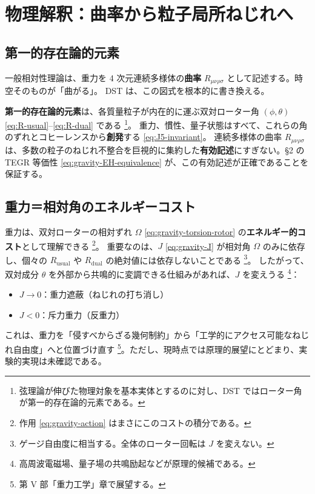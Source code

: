\documentclass[dvipdfmx,a4paper,oneside]{jsbook}
\numberwithin{equation}{chapter}
\begin{document}
\section{物理解釈：曲率から粒子局所ねじれへ}

\subsection{第一的存在論的元素}

一般相対性理論は、重力を 4 次元連続多様体の\textbf{曲率} \(R_{\mu\nu\rho\sigma}\) として記述する。時空そのものが「曲がる」。
DST は、この図式を根本的に書き換える。

\textbf{第一的存在論的元素}は、各質量粒子が内在的に運ぶ双対ローター角 \((\phi, \theta)\) \eqref{eq:R-usual}–\eqref{eq:R-dual} である \footnote{弦理論が伸びた物理対象を基本実体とするのに対し、DST ではローター角が第一的存在論的元素である。}。
重力、慣性、量子状態はすべて、これらの角のずれとコヒーレンスから\textbf{創発}する \eqref{eq:J5-invariant}。
連続多様体の曲率 \(R_{\mu\nu\rho\sigma}\) は、多数の粒子のねじれ不整合を巨視的に集約した\textbf{有効記述}にすぎない。§2 の TEGR 等価性 \eqref{eq:gravity-EH-equivalence} が、この有効記述が正確であることを保証する。

\subsection{重力＝相対角のエネルギーコスト}

重力は、双対ローターの相対ずれ \(\Omega\) \eqref{eq:gravity-torsion-rotor} の\textbf{エネルギー的コスト}として理解できる \footnote{作用 \eqref{eq:gravity-action} はまさにこのコストの積分である。}。
重要なのは、\(J\) \eqref{eq:gravity-J} が相対角 \(\Omega\) のみに依存し、個々の \(R_{\mathrm{usual}}\) や \(R_{\mathrm{dual}}\) の絶対値には依存しないことである \footnote{ゲージ自由度に相当する。全体のローター回転は \(J\) を変えない。}。
したがって、双対成分 \(\theta\) を外部から共鳴的に変調できる仕組みがあれば、\(J\) を変えうる \footnote{高周波電磁場、量子場の共鳴励起などが原理的候補である。}：
\begin{itemize}[leftmargin=2em]
  \item \(J \to 0\)：重力遮蔽（ねじれの打ち消し）
  \item \(J < 0\)：斥力重力（反重力）
\end{itemize}
これは、重力を「侵すべからざる幾何制約」から「工学的にアクセス可能なねじれ自由度」へと位置づけ直す \footnote{第 V 部「重力工学」章で展望する。}。ただし、現時点では原理的展望にとどまり、実験的実現は未確認である。
\end{document}
